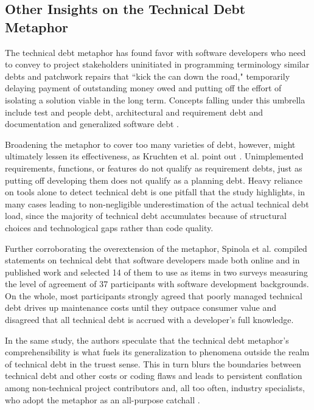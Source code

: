 \subsection{Other Insights on the Technical Debt Metaphor}

The technical debt metaphor has found favor with software developers who need to convey to project stakeholders uninitiated in programming terminology similar debts and patchwork repairs that ``kick the can down the road," temporarily delaying payment of outstanding money owed and putting off the effort of isolating a solution viable in the long term. Concepts falling under this umbrella include test and people debt, architectural and requirement debt and documentation and generalized software debt \cite{sterling2010managing}.

Broadening the metaphor to cover too many varieties of debt, however, might ultimately lessen its effectiveness, as Kruchten et al. point out \cite{Kruchten_td_IEEE}.  Unimplemented requirements, functions, or features do not qualify as requirement debts, just as putting off developing them does not qualify as a planning debt. Heavy reliance on tools alone to detect technical debt is one pitfall that the study highlights, in many cases leading to non-negligible underestimation of the actual technical debt load, since the majority of technical debt accumulates because of structural choices and technological gaps rather than code quality.

Further corroborating the overextension of the metaphor, Spinola et al. \cite{spinola2013investigating} compiled statements on technical debt that software developers made both online and in published work and selected 14 of them to use as items in two surveys measuring the level of agreement of 37 participants with software development backgrounds. On the whole, most participants strongly agreed that poorly managed technical debt drives up maintenance costs until they outpace consumer value and disagreed that all technical debt is accrued with a developer's full knowledge.

In the same study, the authors speculate that the technical debt metaphor's comprehensibility is what fuels its generalization to phenomena outside the realm of technical debt in the truest sense. This in turn blurs the boundaries between technical debt and other costs or coding flaws and leads to persistent conflation among non-technical project contributors and, all too often, industry specialists, who adopt the metaphor as an all-purpose catchall \cite{spinola2013investigating}.

